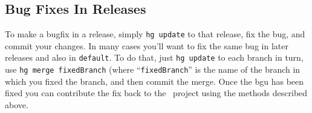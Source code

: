 \subsection{Bug Fixes In Releases}

To make a bugfix in a release, simply {\tt hg update} to that release, fix the bug, and commit your changes. In many cases you'll want to fix the same bug in later releases and also in {\tt default}. To do that, just {\tt hg update} to each branch in turn, use {\tt hg merge fixedBranch} (where ``{\tt fixedBranch}'' is the name of the branch in which you fixed the branch, and then commit the merge. Once the bgu has been fixed you can contribute the fix back to the \glc\ project using the methods described above.